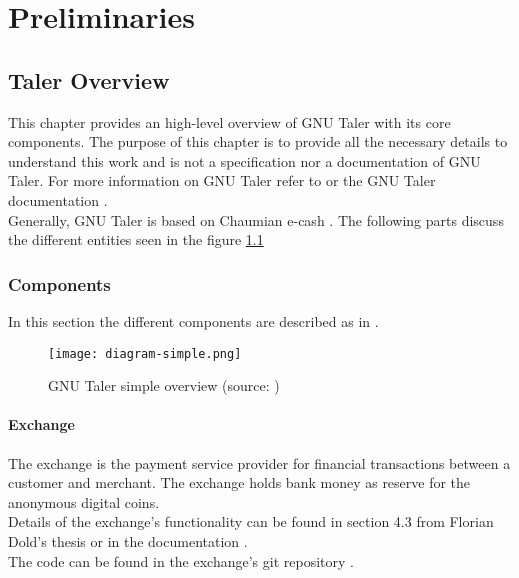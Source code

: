 \chapter{Preliminaries}
\label{chap:preliminaries}
\section{\acl{Taler} Overview}
\label{sec:taler-intro}
This chapter provides an high-level overview of GNU Taler with its core components.
The purpose of this chapter is to provide all the necessary details to understand this work and is not a specification nor a documentation of GNU Taler.
For more information on GNU Taler refer to \cite{dold:the-gnu-taler-system} or the GNU Taler documentation \cite{taler-documentation}.
\\
Generally, GNU Taler is based on Chaumian e-cash \cite{chaum:blind-sign}.
The following parts discuss the different entities seen in the figure \ref{fig:simple-diagram}

\subsection{Components}
\label{sec:taler-components}
In this section the different components are described as in \cite{dold:the-gnu-taler-system}.
\begin{figure}[htp]
    \texttt{[image: diagram-simple.png]}
    \centering
    \caption{GNU Taler simple overview (source: \cite{pic:simple-diagram})}
    \label{fig:simple-diagram}
\end{figure}

\subsubsection{Exchange}
\label{sec:exchange}
The exchange is the payment service provider for financial transactions between a customer and merchant.
The exchange holds bank money as reserve for the anonymous digital coins.
\\
Details of the exchange's functionality can be found in section 4.3 from Florian Dold's thesis \cite{dold:the-gnu-taler-system} or in the documentation \cite{taler-documentation:exchange-operator-manual}.
\\The code can be found in the exchange's git repository \cite{taler-git:exchange}.

